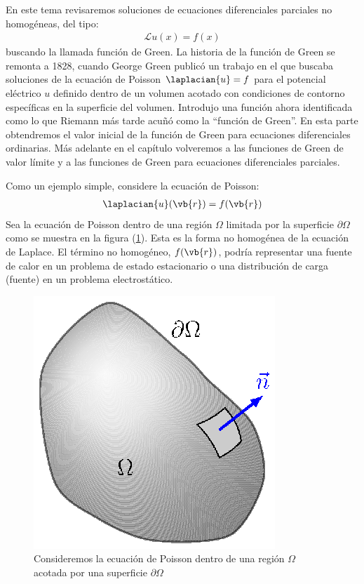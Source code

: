 En este tema revisaremos soluciones de ecuaciones diferenciales parciales no homogéneas, del tipo:
\begin{align*}
\mathcal{L} u (x) = f (x)
\end{align*}
buscando la llamada función de Green. La historia de la función de Green se remonta a 1828, cuando George Green publicó un trabajo en el que buscaba soluciones de la ecuación de Poisson $\laplacian{u} = f$ para el potencial eléctrico $u$ definido dentro de un volumen acotado con condiciones de contorno específicas en la superficie del volumen. Introdujo una función ahora identificada como lo que Riemann más tarde acuñó como la \enquote{función de Green}. En esta parte obtendremos el valor inicial de la función de Green para ecuaciones diferenciales ordinarias. Más adelante en el capítulo volveremos a las funciones de Green de valor límite y a las funciones de Green para ecuaciones diferenciales parciales.
\par
Como un ejemplo simple, considere la ecuación de Poisson:
\begin{align*}
\laplacian{u} (\vb{r}) = f (\vb{r})
\end{align*}
Sea la ecuación de Poisson dentro de una región $\Omega$ limitada por la superficie $\partial \Omega$ como se muestra en la figura (\ref{fig:figura_07_01}). Esta es la forma no homogénea de la ecuación de Laplace. El término no homogéneo, $f (\vb{r})$, podría representar una fuente de calor en un problema de estado estacionario o una distribución de carga (fuente) en un problema electrostático.
\begin{figure}[H]
    \centering
    \includegraphics[scale=1]{Imagenes/Funcion_Green_01.eps}
    \caption{Consideremos la ecuación de Poisson dentro de una región $\Omega$ acotada por una superficie $\partial \Omega$}
    \label{fig:figura_07_01}
\end{figure}
